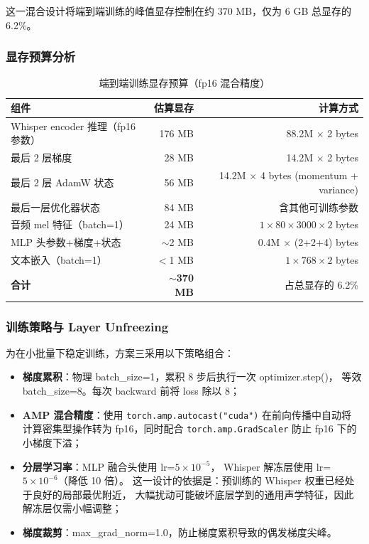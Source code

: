 \documentclass[11pt,a4paper]{ctexart}
\begin{document}
这一混合设计将端到端训练的峰值显存控制在约 370 MB，仅为 6 GB 总显存的 6.2\%。

\subsubsection{显存预算分析}

\begin{table}[H]\centering
\caption{端到端训练显存预算（fp16 混合精度）}
\label{tab:vram}
\begin{tabular}{@{}lrr@{}}\toprule
\textbf{组件} & \textbf{估算显存} & \textbf{计算方式}\\\midrule
Whisper encoder 推理（fp16 参数） & 176 MB & 88.2M $\times$ 2 bytes\\
最后 2 层梯度 & 28 MB & 14.2M $\times$ 2 bytes\\
最后 2 层 AdamW 状态 & 56 MB & 14.2M $\times$ 4 bytes (momentum + variance)\\
最后一层优化器状态 & 84 MB & 含其他可训练参数\\
音频 mel 特征（batch=1） & 24 MB & $1 \times 80 \times 3000 \times 2$ bytes\\
MLP 头参数+梯度+状态 & $\sim$2 MB & 0.4M $\times$ (2+2+4) bytes\\
文本嵌入（batch=1） & $<$1 MB & $1 \times 768 \times 2$ bytes\\\midrule
\textbf{合计} & \textbf{$\sim$370 MB} & 占总显存的 6.2\%\\\bottomrule
\end{tabular}
\end{table}

\subsubsection{训练策略与 Layer Unfreezing}

为在小批量下稳定训练，方案三采用以下策略组合：

\begin{itemize}
  \item \textbf{梯度累积}：物理 batch\_size=1，累积 8 步后执行一次 optimizer.step()，
  等效 batch\_size=8。每次 backward 前将 loss 除以 8；
  \item \textbf{AMP 混合精度}：使用 \texttt{torch.amp.autocast("cuda")} 在前向传播中自动将
  计算密集型操作转为 fp16，同时配合 \texttt{torch.amp.GradScaler} 防止 fp16 下的小梯度下溢；
  \item \textbf{分层学习率}：MLP 融合头使用 lr=$5 \times 10^{-5}$，
  Whisper 解冻层使用 lr=$5 \times 10^{-6}$（降低 10 倍）。
  这一设计的依据是：预训练的 Whisper 权重已经处于良好的局部最优附近，
  大幅扰动可能破坏底层学到的通用声学特征，因此解冻层仅需小幅调整；
  \item \textbf{梯度裁剪}：max\_grad\_norm=1.0，防止梯度累积导致的偶发梯度尖峰。
\end{itemize}
\end{document}
